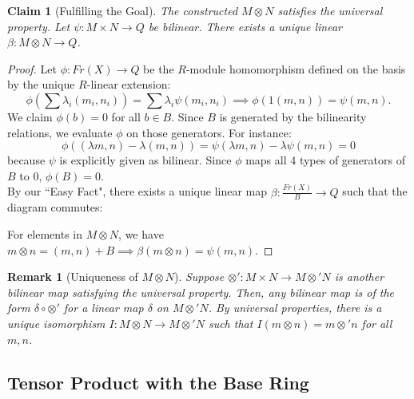 \documentclass[a4paper,12pt]{article}
\newtheorem{claim}[thm]{Claim}
\newtheorem{rmk}[thm]{Remark}
\begin{document}
\begin{claim}[Fulfilling the Goal]
    The constructed $M \otimes N$ satisfies the universal property. Let $\psi: M \times N \to Q$ be bilinear. There exists a unique linear $\beta: M \otimes N \to Q$.
\end{claim}
\begin{proof}
    Let $\phi: Fr(X) \to Q$ be the $R$-module homomorphism defined on the basis by the unique $R$-linear extension:
    \[ \phi\left(\sum \lambda_i(m_i, n_i)\right) = \sum \lambda_i \psi(m_i, n_i) \implies \phi(1(m,n)) = \psi(m,n). \]
    We claim $\phi(b) = 0$ for all $b \in B$. Since $B$ is generated by the bilinearity relations, we evaluate $\phi$ on those generators. For instance:
    \[ \phi((\lambda m, n) - \lambda(m,n)) = \psi(\lambda m, n) - \lambda\psi(m,n) = 0 \]
    because $\psi$ is explicitly given as bilinear. Since $\phi$ maps all 4 types of generators of $B$ to $0$, $\phi(B) = 0$.\\
    By our ``Easy Fact", there exists a unique linear map $\beta: \frac{Fr(X)}{B} \to Q$ such that the diagram commutes:
    \begin{center}
    \end{center}
    For elements in $M \otimes N$, we have $m \otimes n = (m,n) + B \implies \beta(m \otimes n) = \psi(m,n)$.
\end{proof}

\begin{rmk}[Uniqueness of $M \otimes N$]
    Suppose $\otimes': M \times N \to M \otimes' N$ is another bilinear map satisfying the universal property. Then, any bilinear map is of the form $\delta \circ \otimes'$ for a linear map $\delta$ on $M \otimes' N$. By universal properties, there is a unique isomorphism $I: M \otimes N \to M \otimes' N$ such that $I(m \otimes n) = m \otimes' n$ for all $m,n$.
\end{rmk}

\subsection{Tensor Product with the Base Ring}
\end{document}

